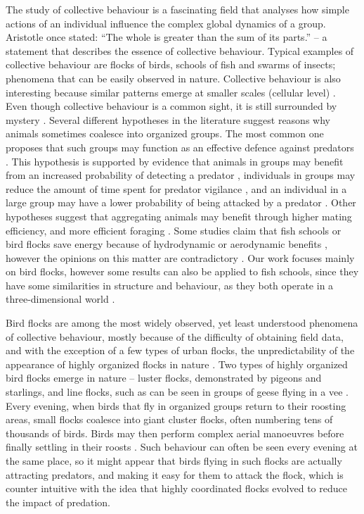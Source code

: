The study of collective behaviour is a fascinating field that analyses how simple actions of an individual influence the complex global dynamics of a group. Aristotle once stated: ``The whole is greater than the sum of its parts.'' -- a statement that describes the essence of collective behaviour. Typical examples of collective behaviour are flocks of birds, schools of fish and swarms of insects; phenomena that can be easily observed in nature. Collective behaviour is also interesting because similar patterns emerge at smaller scales (cellular level) \cite{deisboeck2009collective,spector2003emergence}. Even though collective behaviour is a common sight, it is still surrounded by mystery \cite{lebarbajec2009organized}. Several different hypotheses in the literature suggest reasons why animals sometimes coalesce into organized groups. The most common one proposes that such groups may function as an effective defence against predators \cite{hart2005predator,krause2002living,lebarbajec2009organized,nishimura1997emergence}. This hypothesis is supported by evidence that animals in groups may benefit from an increased probability of detecting a predator \cite{galton1871gregariousness}, individuals in groups may reduce the amount of time spent for predator vigilance \cite{elgar1989predator,sadedin1998influence}, and an individual in a large group may have a lower probability of being attacked by a predator \cite{hamilton1971geometry}. Other hypotheses suggest that aggregating animals may benefit through higher mating efficiency, and more efficient foraging \cite{krebs1994behavioural}. Some studies claim that fish schools or bird flocks save energy because of hydrodynamic or aerodynamic benefits \cite{lissaman1970formation}, however the opinions on this matter are contradictory \cite{bill1976drag,partridge1979evidence,usherwood2011flying}. Our work focuses mainly on bird flocks, however some results can also be applied to fish schools, since they have some similarities in structure and behaviour, as they both operate in a three-dimensional world \cite{krause2002living}.

Bird flocks are among the most widely observed, yet least understood phenomena of collective behaviour, mostly because of the difficulty of obtaining field data, and with the exception of a few types of urban flocks, the unpredictability of the appearance of highly organized flocks in nature \cite{heppner1997threedimensional}. Two types of highly organized bird flocks emerge in nature -- luster flocks, demonstrated by pigeons and starlings, and line flocks, such as can be seen in groups of geese flying in a vee \cite{heppner1974avian}. Every evening, when birds that fly in organized groups return to their roosting areas, small flocks coalesce into giant cluster flocks, often numbering tens of thousands of birds. Birds may then perform complex aerial manoeuvres before finally settling in their roosts \cite{lebarbajec2009organized}. Such behaviour can often be seen every evening at the same place, so it might appear that birds flying in such flocks are actually attracting predators, and making it easy for them to attack the flock, which is counter intuitive with the idea that highly coordinated flocks evolved to reduce the impact of predation.

